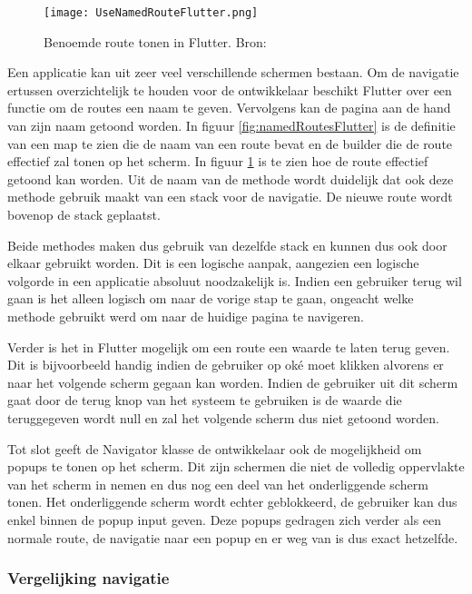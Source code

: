 \begin{figure}
    \texttt{[image: UseNamedRouteFlutter.png]}
    \caption{Benoemde route tonen in Flutter. Bron: \textcite{Flutter.dev2020}}
    \label{fig:useNamedRoutesFlutter}
\end{figure}

Een applicatie kan uit zeer veel verschillende schermen bestaan. Om de navigatie
ertussen overzichtelijk te houden voor de ontwikkelaar beschikt Flutter over een
functie om de routes een naam te geven. Vervolgens kan de pagina aan de hand van
zijn naam getoond worden. In figuur \ref{fig:namedRoutesFlutter} is de definitie
van een map te zien die de naam van een route bevat en de builder die de route
effectief zal tonen op het scherm. In figuur \ref{fig:useNamedRoutesFlutter} is
te zien hoe de route effectief getoond kan worden. Uit de naam van de methode
wordt duidelijk dat ook deze methode gebruik maakt van een stack voor de
navigatie. De nieuwe route wordt bovenop de stack geplaatst.

Beide methodes maken dus gebruik van dezelfde stack en kunnen dus ook door
elkaar gebruikt worden. Dit is een logische aanpak, aangezien een logische
volgorde in een applicatie absoluut noodzakelijk is. Indien een gebruiker terug
wil gaan is het alleen logisch om naar de vorige stap te gaan, ongeacht welke
methode gebruikt werd om naar de huidige pagina te navigeren. 

Verder is het in Flutter mogelijk om een route een waarde te laten terug geven.
Dit is bijvoorbeeld handig indien de gebruiker op oké moet klikken alvorens er
naar het volgende scherm gegaan kan worden. Indien de gebruiker uit dit scherm
gaat door de terug knop van het systeem te gebruiken is de waarde die
teruggegeven wordt null en zal het volgende scherm dus niet getoond worden.

Tot slot geeft de Navigator klasse de ontwikkelaar ook de mogelijkheid om popups
te tonen op het scherm. Dit zijn schermen die niet de volledig oppervlakte van
het scherm in nemen en dus nog een deel van het onderliggende scherm tonen. Het
onderliggende scherm wordt echter geblokkeerd, de gebruiker kan dus enkel binnen
de popup input geven. Deze popups gedragen zich verder als een normale route, de
navigatie naar een popup en er weg van is dus exact hetzelfde.

\subsubsection{Vergelijking navigatie}
\label{subsubsec:vglNavigatie}

